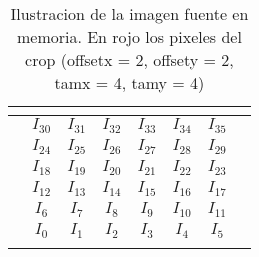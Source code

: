 \begin{table}[h]
\centering
\mem
\begin{tabular}{l|c|c|c|c|c|c|l}
 & \multicolumn{1}{l|}{}      & \multicolumn{1}{l|}{}       & \multicolumn{1}{l|}{}       & \multicolumn{1}{l|}{}       & \multicolumn{1}{l|}{}       & \multicolumn{1}{l|}{}      &  \\ \hline
 & \cellcolor[HTML]{FFCB2F}$I_{30}$ & \cellcolor[HTML]{FFCB2F}$I_{31}$  & \cellcolor[HTML]{FD6864}$I_{32}$  & \cellcolor[HTML]{FD6864}$I_{33}$  & \cellcolor[HTML]{FD6864}$I_{34}$  & \cellcolor[HTML]{FD6864}$I_{35}$ &  \\ \hline
 & \cellcolor[HTML]{FFCB2F}$I_{24}$ & \cellcolor[HTML]{FFCB2F}$I_{25}$  & \cellcolor[HTML]{FD6864}$I_{26}$  & \cellcolor[HTML]{FD6864}$I_{27}$  & \cellcolor[HTML]{FD6864}$I_{28}$  & \cellcolor[HTML]{FD6864}$I_{29}$ &  \\ \hline
 & \cellcolor[HTML]{FFCB2F}$I_{18}$ & \cellcolor[HTML]{FFCB2F}$I_{19}$ & \cellcolor[HTML]{FD6864}$I_{20}$ & \cellcolor[HTML]{FD6864}$I_{21}$ & \cellcolor[HTML]{FD6864}$I_{22}$  & \cellcolor[HTML]{FD6864}$I_{23}$ &  \\ \hline
 & \cellcolor[HTML]{FFCB2F}$I_{12}$ & \cellcolor[HTML]{FFCB2F}$I_{13}$ & \cellcolor[HTML]{FD6864}$I_{14}$ & \cellcolor[HTML]{FD6864}$I_{15}$ & \cellcolor[HTML]{FD6864}$I_{16}$  & \cellcolor[HTML]{FD6864}$I_{17}$ &  \\ \hline
 & \cellcolor[HTML]{FFCB2F}$I_{6}$ & \cellcolor[HTML]{FFCB2F}$I_{7}$ & \cellcolor[HTML]{FFCB2F}$I_{8}$ & \cellcolor[HTML]{FFCB2F}$I_{9}$ & \cellcolor[HTML]{FFCB2F}$I_{10}$  & \cellcolor[HTML]{FFCB2F}$I_{11}$ &  \\ \hline
 & \cellcolor[HTML]{FFCB2F}$I_{0}$ & \cellcolor[HTML]{FFCB2F}$I_{1}$ & \cellcolor[HTML]{FFCB2F}$I_{2}$ & \cellcolor[HTML]{FFCB2F}$I_{3}$ & \cellcolor[HTML]{FFCB2F}$I_{4}$  & \cellcolor[HTML]{FFCB2F}$I_{5}$ &  \\ \hline
 & \multicolumn{1}{l|}{}      & \multicolumn{1}{l|}{}       & \multicolumn{1}{l|}{}       & \multicolumn{1}{l|}{}       & \multicolumn{1}{l|}{}       & \multicolumn{1}{l|}{}      &
\end{tabular}
\caption{Ilustracion de la imagen fuente en memoria. En rojo los pixeles del crop \newline
(offsetx = 2, offsety = 2, tamx = 4, tamy = 4)}
\end{table}

